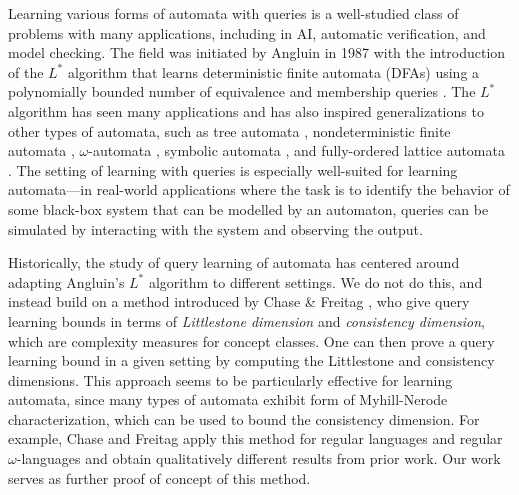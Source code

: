 \documentclass[runningheads]{llncs}
\begin{document}
Learning various forms of automata with queries is a well-studied class of problems with many applications, including in AI, automatic verification, and model checking. 
The field was initiated by Angluin in 1987 with the introduction of the $L^*$ algorithm that learns deterministic finite automata (DFAs) using a polynomially bounded number of equivalence and membership queries \cite{angluin:learning-regular-sets}.
The $L^*$ algorithm has seen many applications and has also inspired generalizations to other types of automata, such as tree automata \cite{yasubumi:learning-context-free-grammars}, nondeterministic finite automata \cite{bollig-etal:learning-NFA}, $\omega$-automata \cite{angluin-fisman:learning-regular-omega-languages}, symbolic automata \cite{drews-dantoni:learning-symoblic-automata}, and fully-ordered lattice automata \cite{fisman-saadon:learning-characterizing-fully-ordered-lattice-automata}. 
The setting of learning with queries is especially well-suited for learning automata---in real-world applications where the task is to identify the behavior of some black-box system that can be modelled by an automaton, queries can be simulated by interacting with the system and observing the output.

Historically, the study of query learning of automata has centered around adapting Angluin's $L^*$ algorithm to different settings.
We do not do this, and instead build on a method introduced by Chase \& Freitag \cite{chase-freitag:bounds-in-query-learning}, who give query learning bounds in terms of \emph{Littlestone dimension} and \emph{consistency dimension}, which are complexity measures for concept classes. 
One can then prove a query learning bound in a given setting by computing the Littlestone and consistency dimensions.
This approach seems to be particularly effective for learning automata, since many types of automata exhibit form of Myhill-Nerode characterization, which can be used to bound the consistency dimension.
For example, Chase and Freitag apply this method for regular languages and regular $\omega$-languages and obtain qualitatively different results from prior work.
Our work serves as further proof of concept of this method.
\end{document}
